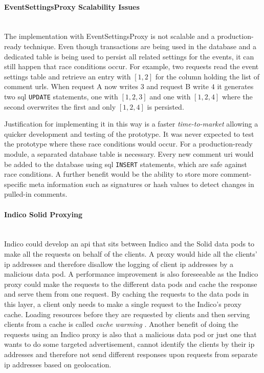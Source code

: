 \paragraph{EventSettingsProxy Scalability Issues}\mbox{}\\

The implementation with EventSettingsProxy is not scalable and a production-ready technique. Even though transactions are being used in the database and a dedicated table is being used to persist all related settings for the events, it can still happen that race conditions occur. For example, two requests read the event settings table and retrieve an entry with $[1,2]$ for the column holding the list of comment \glspl{url}. When request A now writes $3$ and request B write $4$ it generates two \gls{sql} \texttt{UPDATE} statements, one with $[1,2,3]$ and one with $[1,2,4]$ where the second overwrites the first and only $[1,2,4]$ is persisted.

Justification for implementing it in this way is a faster \textit{time-to-market} allowing a quicker development and testing of the prototype. It was never expected to test the prototype where these race conditions would occur. For a production-ready module, a separated database table is necessary. Every new comment \gls{uri} would be added to the database using \gls{sql} \texttt{INSERT} statements, which are safe against race conditions. A further benefit would be the ability to store more comment-specific meta information such as signatures or hash values to detect changes in pulled-in comments.
\vspace{0.5cm}
\paragraph{Indico Solid Proxying}\mbox{}\\

Indico could develop an \gls{api} that sits between Indico and the Solid data pods to make all the requests on behalf of the clients. A proxy would hide all the clients' \gls{ip} addresses and therefore disallow the logging of client \gls{ip} addresses by a malicious data pod. A performance improvement is also foreseeable as the Indico proxy could make the requests to the different data pods and cache the response and serve them from one request. By caching the requests to the data pods in this layer, a client only needs to make a single request to the Indico's proxy cache. Loading resources before they are requested by clients and then serving clients from a cache is called \textit{cache warming} \cite{cache-warming}. Another benefit of doing the requests using an Indico proxy is also that a malicious data pod or just one that wants to do some targeted advertisement, cannot identify the clients by their \gls{ip} addresses and therefore not send different responses upon requests from separate \gls{ip} addresses based on geolocation.
